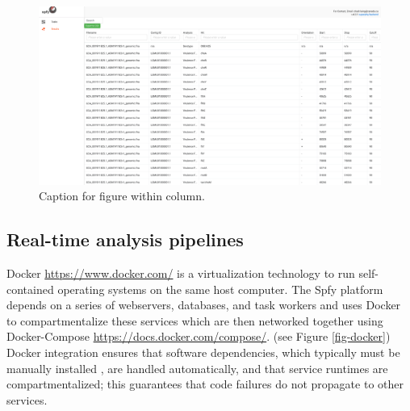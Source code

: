\documentclass[a4,center,fleqn]{NAR}
\begin{document}
\begin{figure}[t]
\begin{center}
\includegraphics{images/tables.png}
\end{center}
\caption{Caption for figure within column.}
\label{fig-tables}
\end{figure}

\subsection{Real-time analysis pipelines}



Docker \url{https://www.docker.com/} is a virtualization technology to run self-contained operating systems on the same host computer.
The Spfy platform depends on a series of webservers, databases, and task workers and uses Docker to compartmentalize these services which are then networked together using Docker-Compose \url{https://docs.docker.com/compose/}.
(see Figure \ref{fig-docker})
Docker integration ensures that software dependencies, which typically must be manually installed \cite{doi:10.1093/bioinformatics/btu153,laing2010pan,inouye2014srst2,naccache2014cloud}, are handled automatically, and that service runtimes are compartmentalized; this guarantees that code failures do not propagate to other services.
\end{document}
